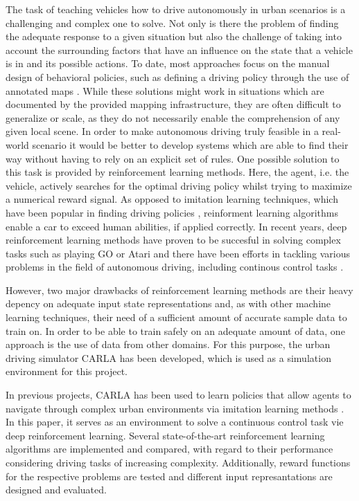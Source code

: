 \documentclass[letterpaper, 10 pt, conference]{ieeeconf}  %
\begin{document}

The task of teaching vehicles how to drive autonomously in urban scenarios is a challenging and complex one to solve. Not only is there the problem of finding the adequate response to a given situation but also the challenge of taking into account the surrounding factors that have an influence on the state that a vehicle is in and its possible actions. To date, most approaches focus on the manual design of behavioral policies, such as defining a driving policy through the use of annotated maps \cite{7339478}. While these solutions might work in situations which are documented by the provided mapping infrastructure, they are often difficult to generalize or scale, as they do not necessarily enable the comprehension of any given local scene. In order to make autonomous driving truly feasible in a real-world scenario it would be better to develop systems which are able to find their way without having to rely on an explicit set of rules. One possible solution to this task is provided by reinforcement learning methods. Here, the agent, i.e. the vehicle, actively searches for the optimal driving policy whilst trying to maximize a numerical reward signal. As opposed to imitation learning techniques, which have been popular in finding driving policies \cite{kendall2019learning}, reinforment learning algorithms enable a car to exceed human abilities, if applied correctly. In recent years, deep reinforcement learning methods have proven to be succesful in solving complex tasks such as playing GO \cite{44806} or Atari \cite{mnih2013playing} and there have been efforts in tackling various problems in the field of autonomous driving, including continous control tasks \cite{journals/corr/LillicrapHPHETS15}.

However, two major drawbacks of reinforcement learning methods are their heavy depency on adequate input state representations \cite{DBLP:journals/corr/abs-1904-09503} and, as with other machine learning techniques, their need of a sufficient amount of accurate sample data to train on. In order to be able to train safely on an adequate amount of data, one approach is the use of data from other domains. For this purpose, the urban driving simulator CARLA has been developed, which is used as a simulation environment for this project.

In previous projects, CARLA has been used to learn policies that allow agents to navigate through complex urban environments via imitation learning methods \cite{DBLP:journals/corr/abs-1710-02410}\cite{DBLP:journals/corr/abs-1903-00640}. In this paper, it serves as an environment to solve a continuous control task vie deep reinforcement learning. Several state-of-the-art reinforcement learning algorithms are implemented and compared, with regard to their performance considering driving tasks of increasing complexity. Additionally, reward functions for the respective problems are tested and different input represantations are designed and evaluated.
\end{document}
